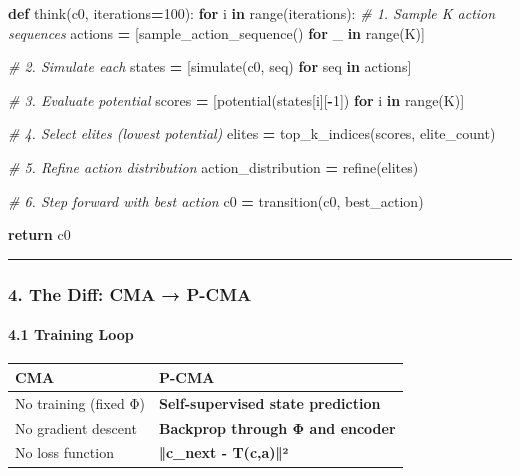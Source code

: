 \documentclass[
  11pt,
  a4paper,
]{article}
\newenvironment{Shaded}{\begin{snugshade}}{\end{snugshade}}
\newcommand{\BuiltInTok}[1]{#1}
\newcommand{\CommentTok}[1]{\textcolor[rgb]{0.56,0.35,0.01}{\textit{#1}}}
\newcommand{\ControlFlowTok}[1]{\textcolor[rgb]{0.13,0.29,0.53}{\textbf{#1}}}
\newcommand{\DecValTok}[1]{\textcolor[rgb]{0.00,0.00,0.81}{#1}}
\newcommand{\KeywordTok}[1]{\textcolor[rgb]{0.13,0.29,0.53}{\textbf{#1}}}
\newcommand{\NormalTok}[1]{#1}
\newcommand{\OperatorTok}[1]{\textcolor[rgb]{0.81,0.36,0.00}{\textbf{#1}}}
\begin{document}
\begin{Shaded}
\begin{Highlighting}[]
\KeywordTok{def}\NormalTok{ think(c0, iterations}\OperatorTok{=}\DecValTok{100}\NormalTok{):}
    \ControlFlowTok{for}\NormalTok{ i }\KeywordTok{in} \BuiltInTok{range}\NormalTok{(iterations):}
        \CommentTok{\# 1. Sample K action sequences}
\NormalTok{        actions }\OperatorTok{=}\NormalTok{ [sample\_action\_sequence() }\ControlFlowTok{for}\NormalTok{ \_ }\KeywordTok{in} \BuiltInTok{range}\NormalTok{(K)]}
        
        \CommentTok{\# 2. Simulate each}
\NormalTok{        states }\OperatorTok{=}\NormalTok{ [simulate(c0, seq) }\ControlFlowTok{for}\NormalTok{ seq }\KeywordTok{in}\NormalTok{ actions]}
        
        \CommentTok{\# 3. Evaluate potential}
\NormalTok{        scores }\OperatorTok{=}\NormalTok{ [potential(states[i][}\OperatorTok{{-}}\DecValTok{1}\NormalTok{]) }\ControlFlowTok{for}\NormalTok{ i }\KeywordTok{in} \BuiltInTok{range}\NormalTok{(K)]}
        
        \CommentTok{\# 4. Select elites (lowest potential)}
\NormalTok{        elites }\OperatorTok{=}\NormalTok{ top\_k\_indices(scores, elite\_count)}
        
        \CommentTok{\# 5. Refine action distribution}
\NormalTok{        action\_distribution }\OperatorTok{=}\NormalTok{ refine(elites)}
        
        \CommentTok{\# 6. Step forward with best action}
\NormalTok{        c0 }\OperatorTok{=}\NormalTok{ transition(c0, best\_action)}
    
    \ControlFlowTok{return}\NormalTok{ c0}
\end{Highlighting}
\end{Shaded}

\begin{center}\rule{0.5\linewidth}{0.5pt}\end{center}

\subsubsection{4. The Diff: CMA → P-CMA}\label{the-diff-cma-p-cma}

\paragraph{4.1 Training Loop}\label{training-loop}

\begin{longtable}[]{@{}ll@{}}
\toprule\noalign{}
CMA & \textbf{P-CMA} \\
\midrule\noalign{}
\endhead
\bottomrule\noalign{}
\endlastfoot
No training (fixed Φ) & \textbf{Self-supervised state prediction} \\
No gradient descent & \textbf{Backprop through Φ and encoder} \\
No loss function & \textbf{‖c\_next - T(c,a)‖²} \\
\end{longtable}
\end{document}
